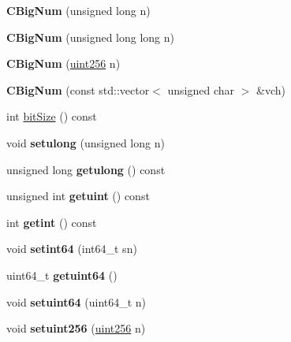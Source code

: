 \begin{DoxyCompactItemize}
{\bfseries C\+Big\+Num} (unsigned long n)
\item 
\mbox{\label{class_c_big_num_a18865e153442cd15aec3bfc9acda8dce}} 
{\bfseries C\+Big\+Num} (unsigned long long n)
\item 
\mbox{\label{class_c_big_num_a47684495c159d6279490151ae4497332}} 
{\bfseries C\+Big\+Num} (\mbox{\hyperlink{classuint256}{uint256}} n)
\item 
\mbox{\label{class_c_big_num_ad3c2843e6755a612b8734eb6e0f03ced}} 
{\bfseries C\+Big\+Num} (const std\+::vector$<$ unsigned char $>$ \&vch)
\item 
int \mbox{\hyperlink{class_c_big_num_ab4b035b81263dcba7b996997ecdcea8d}{bit\+Size}} () const
\item 
\mbox{\label{class_c_big_num_ac8c00c696d9cbd3fa309a2d0a6bc4b1d}} 
void {\bfseries setulong} (unsigned long n)
\item 
\mbox{\label{class_c_big_num_a035dfd4984c0dfb5400e83afa11e0d21}} 
unsigned long {\bfseries getulong} () const
\item 
\mbox{\label{class_c_big_num_a50e032d16c3d6a4c7a12e21b55ef8ae5}} 
unsigned int {\bfseries getuint} () const
\item 
\mbox{\label{class_c_big_num_afc4744c69da2e73b6e6a8941abf6d244}} 
int {\bfseries getint} () const
\item 
\mbox{\label{class_c_big_num_aca73fa36a797c91b30515ae61cc5d765}} 
void {\bfseries setint64} (int64\+\_\+t sn)
\item 
\mbox{\label{class_c_big_num_a2cc30d131f0ef727d0ba21f964158b2b}} 
uint64\+\_\+t {\bfseries getuint64} ()
\item 
\mbox{\label{class_c_big_num_ae61a86bfe3b286a2cfda45ffba1c1310}} 
void {\bfseries setuint64} (uint64\+\_\+t n)
\item 
\mbox{\label{class_c_big_num_ade94c52f2f5d5a20e605125fcf727a34}} 
void {\bfseries setuint256} (\mbox{\hyperlink{classuint256}{uint256}} n)

\end{DoxyCompactItemize}
